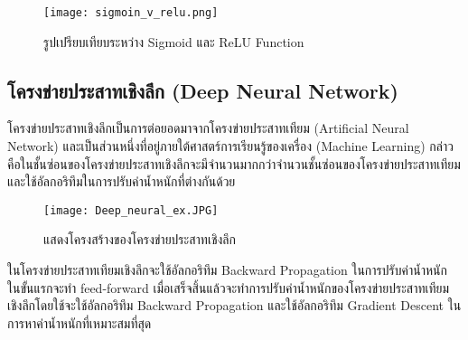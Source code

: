 \begin{figure}[h]
    \centering
    \texttt{[image: sigmoin\_v\_relu.png]}
    \caption{รูปเปรียบเทียบระหว่าง Sigmoid และ ReLU Function}
    \label{Fig:Sigmoind_v_Relu}
\end{figure}

\subsection{โครงข่ายประสาทเชิงลึก (Deep Neural Network)} \par
โครงข่ายประสาทเชิงลึกเป็นการต่อยอดมาจากโครงข่ายประสาทเทียม (Artificial Neural Network) และเป็นส่วนหนึ่งที่อยู่ภายใต้ศาสตร์การเรียนรู้ของเครื่อง (Machine Learning)
กล่าวคือในชั้นซ่อนของโครงข่ายประสาทเชิงลึกจะมีจำนวนมากกว่าจำนวนชั้นซ่อนของโครงข่ายประสาทเทียม
และใช้อัลกอริทึมในการปรับค่าน้ำหนักที่ต่างกันด้วย

\begin{figure}[h]
    \centering
    \texttt{[image: Deep\_neural\_ex.JPG]}
    \caption{แสดงโครงสร้างของโครงข่ายประสาทเชิงลึก}
    \label{Fig:Deep_neuralnet}
\end{figure}

ในโครงข่ายประสาทเทียมเชิงลึกจะใช้อัลกอริทึม Backward Propagation ในการปรับค่าน้ำหนัก 
ในขั้นแรกจะทำ feed-forward เมื่อเสร็จสิ้นแล้วจะทําการปรับค่าน้ำหนักของโครงข่ายประสาทเทียมเชิงลึกโดยใช้จะใช้อัลกอริทึม 
Backward Propagation และใช้อัลกอริทึม Gradient Descent ในการหาค่าน้ำหนักที่เหมาะสมที่สุด

